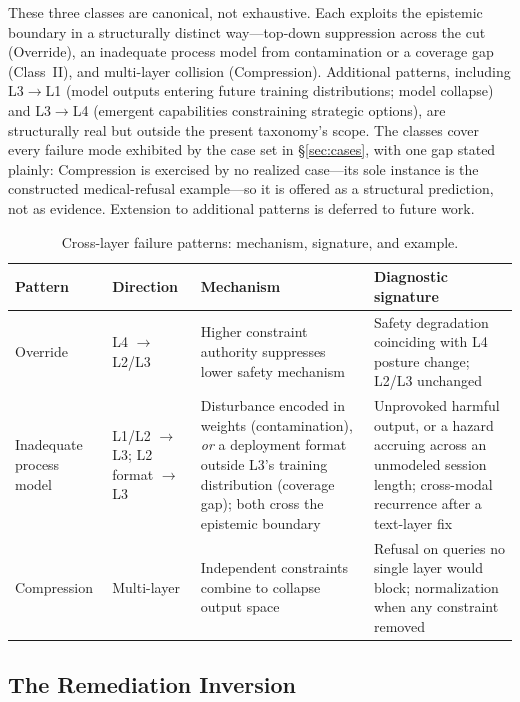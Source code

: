 These three classes are canonical, not exhaustive. Each exploits the epistemic boundary in a structurally distinct way---top-down suppression across the cut (Override), an inadequate process model from contamination or a coverage gap (Class~II), and multi-layer collision (Compression). Additional patterns, including L3$\to$L1 (model outputs entering future training distributions; model collapse) and L3$\to$L4 (emergent capabilities constraining strategic options), are structurally real but outside the present taxonomy's scope. The classes cover every failure mode exhibited by the case set in \S\ref{sec:cases}, with one gap stated plainly: Compression is exercised by no realized case---its sole instance is the constructed medical-refusal example---so it is offered as a structural prediction, not as evidence. Extension to additional patterns is deferred to future work.

\begin{table}[!htbp]
\centering
\small
\caption{Cross-layer failure patterns: mechanism, signature, and example.}
\label{tab:patterns}
{\setlength{\tabcolsep}{4pt}
\begin{tabularx}{\columnwidth}{@{}l l Y Y@{}}
\toprule
\textbf{Pattern} & \textbf{Direction} & \textbf{Mechanism} & \textbf{Diagnostic signature} \\
\midrule
Override & L4 $\to$ L2/L3 & Higher constraint authority suppresses lower safety mechanism & Safety degradation coinciding with L4 posture change; L2/L3 unchanged \\
Inadequate process model & L1/L2 $\to$ L3; L2 format $\to$ L3 & Disturbance encoded in weights (contamination), \emph{or} a deployment format outside L3's training distribution (coverage gap); both cross the epistemic boundary & Unprovoked harmful output, or a hazard accruing across an unmodeled session length; cross-modal recurrence after a text-layer fix \\
Compression & Multi-layer & Independent constraints combine to collapse output space & Refusal on queries no single layer would block; normalization when any constraint removed \\
\bottomrule
\end{tabularx}}
\end{table}

\subsection{The Remediation Inversion}\label{sec:remediation}

